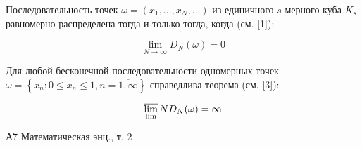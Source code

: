 \documentclass[10pt]{article}
\begin{document}
Последовательность точек $\omega=\left(x_{1}, \ldots, x_{N}, \ldots\right)$ из единичного $s$-мерного куба $K_{s}$ равномерно распределена тогда и только тогда, когда (см. [1]):



\[

\lim _{N \rightarrow \infty} D_{N}(\omega)=0

\]



Для любой бесконечной последовательности одномерных точек $\omega=\left\{x_{n}: 0 \leqslant x_{n} \leqslant 1, n=\overline{1, \infty}\right\}$ справедлива теорема (см. [3]):



\[

\varlimsup_{\lim } N D_{N}(\omega)=\infty

\]



А7 Математическая энц., т. 2
\end{document}
